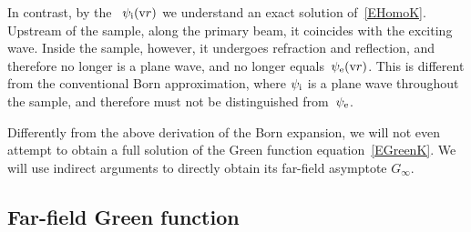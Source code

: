 In contrast, by the ~$\psi_{\text{i}}(\text{v}{r})$
%
%
%
we understand an exact solution of~\cref{EHomoK}.
Upstream of the sample, along the primary beam, it coincides with the exciting wave.
Inside the sample, however, it undergoes refraction and reflection,
and therefore no longer is a plane wave, and no longer equals~$\psi_{\text{e}}(\text{v}{r})$.
This is different from the conventional Born approximation,
where $\psi_{\text{i}}$ is a plane wave throughout the sample,
and therefore must not be distinguished from~$\psi_{\text{e}}$.

Differently from the above derivation of the Born expansion,
we will not even attempt to obtain a full solution
%
of the Green function equation~\cref{EGreenK}.
We will use indirect arguments to directly obtain its far-field asymptote $G_\infty$.

\subsection{Far-field Green function}\label{SfarDW}


